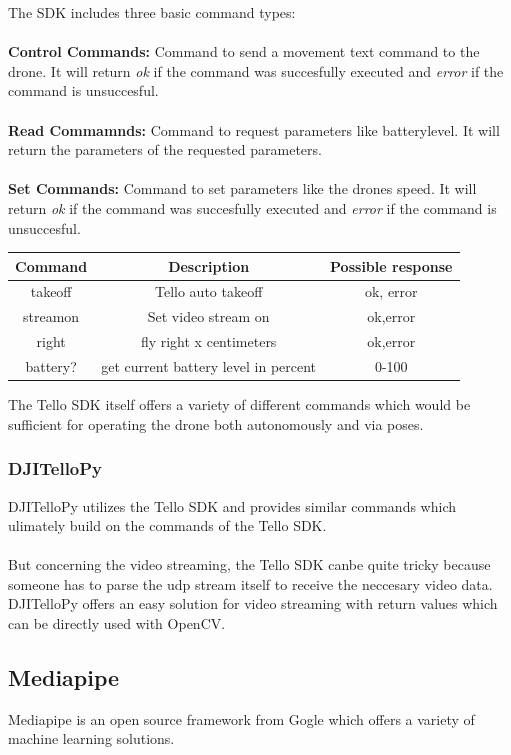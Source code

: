\documentclass[a4paper,11pt,singlespacing]{article}
\begin{document}
The SDK includes three basic command types:\\\\
\textbf{Control Commands:} Command to send a movement text command to the drone. It will return \textit{ok} if the command was succesfully executed 
and \textit{error} if the command is unsuccesful.\\\\
\textbf{Read Commamnds:} Command to request parameters like batterylevel. It will return the parameters of the requested parameters.\\\\
\textbf{Set Commands:} Command to set parameters like the drones speed. It will return \textit{ok} if the command was succesfully executed 
and \textit{error} if the command is unsuccesful.

\begin{center}
	\begin{tabular}{c | c | c} 
	\hline
	 Command & Description & Possible response\\
	 \hline
	 takeoff & Tello auto takeoff & ok, error \\
	 streamon & Set video stream on & ok,error\\
	 right & fly right x centimeters & ok,error\\
	 battery? & get current battery level in percent & 0-100\\
	\end{tabular}
\end{center}

The Tello SDK itself offers a variety of different commands which would be 
sufficient for operating the drone both autonomously and via poses.

\subsubsection{DJITelloPy}

DJITelloPy\cite{DJITelloPy} utilizes the Tello SDK and provides similar commands which ulimately
build on the commands of the Tello SDK.
\\\\
But concerning the video streaming, the Tello SDK canbe quite tricky because 
someone has to parse the udp stream itself to receive the neccesary video data.
\\
DJITelloPy offers an easy solution for video streaming with return values 
which can be directly used with OpenCV.

\subsection{Mediapipe}
Mediapipe\cite{Mediapipe} is an open source framework from Gogle which offers a 
variety of machine learning solutions.
\end{document}
